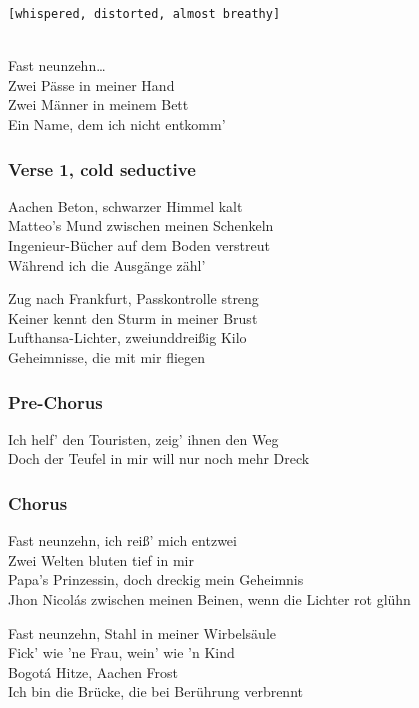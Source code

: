 \texttt{{[}whispered,\ distorted,\ almost\ breathy{]}}\strut \\
Fast neunzehn\ldots{}\\
Zwei Pässe in meiner Hand\\
Zwei Männer in meinem Bett\\
Ein Name, dem ich nicht entkomm'

\subsubsection{Verse 1, cold seductive}\label{verse-1-cold-seductive}

Aachen Beton, schwarzer Himmel kalt\\
Matteo's Mund zwischen meinen Schenkeln\\
Ingenieur-Bücher auf dem Boden verstreut\\
Während ich die Ausgänge zähl'

Zug nach Frankfurt, Passkontrolle streng\\
Keiner kennt den Sturm in meiner Brust\\
Lufthansa-Lichter, zweiunddreißig Kilo\\
Geheimnisse, die mit mir fliegen

\subsubsection{Pre-Chorus}\label{pre-chorus-54}

Ich helf' den Touristen, zeig' ihnen den Weg\\
Doch der Teufel in mir will nur noch mehr Dreck

\subsubsection{Chorus}\label{chorus-71}

Fast neunzehn, ich reiß' mich entzwei\\
Zwei Welten bluten tief in mir\\
Papa's Prinzessin, doch dreckig mein Geheimnis\\
Jhon Nicolás zwischen meinen Beinen, wenn die Lichter rot glühn

Fast neunzehn, Stahl in meiner Wirbelsäule\\
Fick' wie 'ne Frau, wein' wie 'n Kind\\
Bogotá Hitze, Aachen Frost\\
Ich bin die Brücke, die bei Berührung verbrennt

